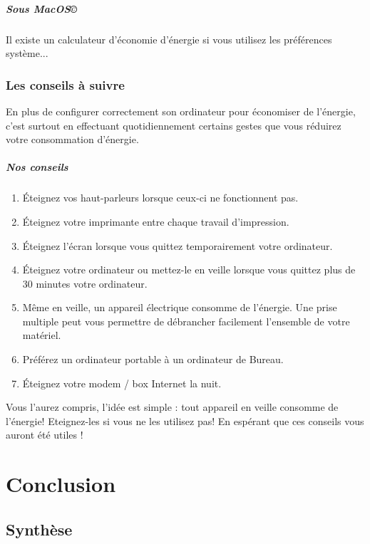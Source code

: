 \documentclass[a4paper,11pt,french]{report}
\begin{document}
\paragraph{Sous MacOS\copyright}
Il existe un calculateur d'économie d'énergie si vous utilisez les préférences système...



\subsection{Les conseils à suivre}
En plus de configurer correctement son ordinateur pour économiser de l'énergie, c'est surtout en effectuant quotidiennement certains gestes que vous réduirez votre consommation d'énergie.\\

\paragraph{Nos conseils}
\begin{enumerate}
\item Éteignez vos haut-parleurs lorsque ceux-ci ne fonctionnent pas.
\item Éteignez votre imprimante entre chaque travail d'impression.
\item Éteignez l'écran lorsque vous quittez temporairement votre ordinateur.
\item Éteignez votre ordinateur ou mettez-le en veille lorsque vous quittez plus de 30 minutes votre ordinateur.
\item Même en veille, un appareil électrique consomme de l'énergie. Une prise multiple peut vous permettre de débrancher facilement l'ensemble de votre matériel.
\item Préférez un ordinateur portable à un ordinateur de Bureau.
\item Éteignez votre modem / box Internet la nuit.
\end{enumerate}

Vous l'aurez compris, l'idée est simple : tout appareil en veille consomme de l'énergie! Eteignez-les si vous ne les utilisez pas!
En espérant que ces conseils vous auront été utiles !

\newpage
\chapter*{Conclusion}
\section{Synthèse}
\end{document}
